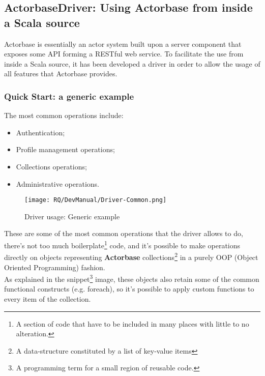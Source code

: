 \documentclass{scalatekids-article}
\begin{document}

\subsection{ActorbaseDriver: Using Actorbase from inside a Scala source}

Actorbase is essentially an actor system built upon a server component that
exposes some API forming a RESTful web service. To facilitate the use from
inside a Scala source, it has been developed a driver in order to allow the
usage of all features that Actorbase provides.\\

\subsubsection{Quick Start: a generic example}

The most common operations include:
\begin{itemize}
\item Authentication;
\item Profile management operations;
\item Collections operations;
\item Administrative operations.
\end{itemize}

\begin{figure}[H]
  \begin{center}
    \texttt{[image: RQ/DevManual/Driver-Common.png]}
    \caption{Driver usage: Generic example}
  \end{center}
\end{figure}

These are some of the most common operations that the driver allows to do,
there's not too much boilerplate\footnote{A section of code that have to be
  included in many places with little to no alteration.} code, and it's possible
to make operations directly on objects representing \textbf{Actorbase}
collections\footnote{A data-structure constituted by a list of key-value items\label{coll}}
in a purely OOP (Object Oriented Programming) fashion.\\ As explained in
the snippet\footnote{A programming term for a small region of reusable code.}
image, these objects also retain some of the common functional constructs (e.g.
foreach), so it's possible to apply custom functions to every item of the
collection.
\end{document}
